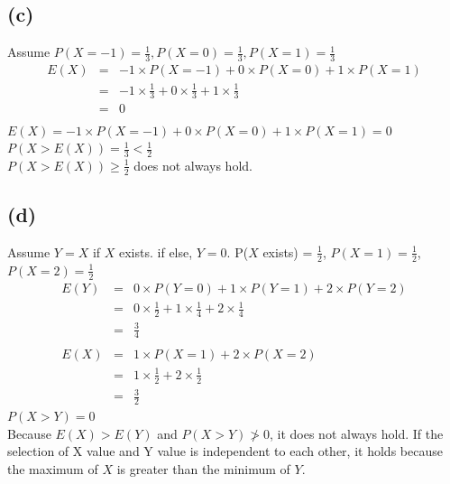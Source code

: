 \documentclass{article} %
\begin{document}
\subsection*{(c)}
Assume $P(X = -1) = \frac{1}{3}, P(X = 0) = \frac{1}{3}, P(X = 1) = \frac{1}{3}$\\
\[\begin{array}{rll}
    E(X)    &=& -1\times P(X=-1) + 0\times P(X=0) + 1\times P(X=1) \\
            &=& -1\times \frac{1}{3} + 0 \times \frac{1}{3} + 1\times \frac{1}{3}\\
            &=& 0\\

\end{array}\]
$E(X) = -1\times P(X=-1) + 0\times P(X=0) + 1\times P(X=1) = 0$\\
$P(X>E(X)) = \frac{1}{3} <\frac{1}{2}$\\
$P(X > E(X))\geq \frac{1}{2}$ does not always hold.\\
\subsection*{(d)}
Assume $Y=X$ if $X$ exists. if else, $Y=0$. P($X$ exists) = $\frac{1}{2}$, $P(X=1) = \frac{1}{2}$, $P(X=2) = \frac{1}{2}$\\
\[\begin{array}{rll}
    E(Y)    &=& 0\times P(Y=0) + 1\times P(Y=1) + 2\times P(Y=2) \\
            &=& 0\times \frac{1}{2} + 1 \times \frac{1}{4} + 2\times \frac{1}{4}\\
            &=& \frac{3}{4}\\
            \\
    E(X)    &=& 1\times P(X=1) + 2\times P(X=2)\\
            &=& 1\times \frac{1}{2} + 2\times \frac{1}{2}\\
            &=& \frac{3}{2}
\end{array}\]
$P(X>Y) = 0$\\
Because $E(X) > E(Y)$ and $P(X>Y)\not> 0$, it does not always hold. If the selection of X value and Y value is independent to each other, it holds because the maximum of $X$ is greater than the minimum of $Y$.\\
\end{document}
